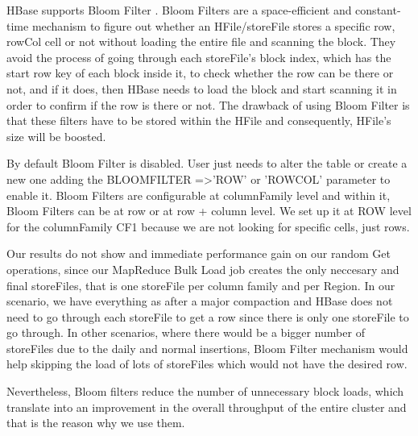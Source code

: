 \begin{itemize}
HBase supports Bloom Filter \cite{bloom1970space}. Bloom Filters are a space-efficient and constant-time mechanism to figure out whether an HFile/storeFile stores a specific row, rowCol cell or not without loading the entire file and scanning the block. They avoid the process of going through each storeFile's block index, which has the start row key of each block inside it, to check whether the row can be there or not, and if it does, then HBase needs to load the block and start scanning it in order to confirm if the row is there or not. The drawback of using Bloom Filter is that these filters have to be stored within the HFile and consequently, HFile's size will be boosted. 
\par
By default Bloom Filter is disabled. User just needs to alter the table or create a new one adding the BLOOMFILTER =\textgreater 'ROW' or 'ROWCOL' parameter to enable it. Bloom Filters are configurable at columnFamily level and within it, Bloom Filters can be at row or at row + column level. We set up it at ROW level for the columnFamily CF1 because we are not looking for specific cells, just rows.
\bigskip

Our results do not show and immediate performance gain on our random Get operations, since our MapReduce Bulk Load job creates the only neccesary and final storeFiles, that is one storeFile per column family and per Region. In our scenario, we have everything as after a major compaction and HBase does not need to go through each storeFile to get a row since there is only one storeFile to go through. In other scenarios, where there would be a bigger number of storeFiles due to the daily and normal insertions, Bloom Filter mechanism would help skipping the load of lots of storeFiles which would not have the desired row.
\par
Nevertheless, Bloom filters reduce the number of unnecessary block loads, which translate into an improvement in the overall throughput of the entire cluster and that is the reason why we use them.



 


\end{itemize}











